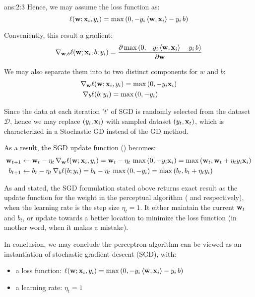 \documentclass{tron}
\begin{document}
\begin{answer}[SGD]{ans:2:3}
	Hence, we may assume the loss function as:
    \begin{equation}
    	\ell(\mathbf{w};\mathbf{x}_i,y_i) = \max{(0, - y_i\,\langle \mathbf{w}, \mathbf{x}_i \rangle - y_i \, b)}
    \end{equation}

    Conveniently, this result a gradient:
    \begin{equation}
    	\nabla_{\mathbf{w},b} \ell(\mathbf{w};\mathbf{x}_i,b;y_i) = \frac{\partial \max{(0, - y_i\,\langle \mathbf{w}, \mathbf{x}_i \rangle - y_i \, b)}}{\partial \mathbf{w}}
    \end{equation}
    
    We may also separate them into to two distinct components for $w$ and $b$:
    \begin{align}
    	\nabla_{\mathbf{w}} & \ell(\mathbf{w};\mathbf{x}_i,y_i) = \max{(0, -y_i \mathbf{x}_i)}\\
    	\nabla_{b}   & \ell(b;y_i) = \max{(0, -y_i)}
    \end{align}

	Since the data at each iteration '$t$' of SGD is randomly selected from the dataset $\mathcal{D}$, hence we may replace $(y_i,\mathbf{x}_i)$ with sampled dataset $(y_t,\mathbf{x}_t)$, which is characterized in a Stochastic GD instead of the GD method. 
	
	As a result, the SGD update function () becomes:
	\begin{align}
		\mathbf{w}_{t+1} &\leftarrow \mathbf{w}_t - \eta_t \,\nabla_{\mathbf{w}}\ell(\mathbf{w};\mathbf{x}_i,y_i) = \mathbf{w}_t - \eta_t \, \max{(0, -y_i \mathbf{x}_i)} = \max{(\mathbf{w}_t, \mathbf{w}_t + \eta_t y_i \mathbf{x}_i)} \label{eqn:q23:result}\\
		b_{t+1} &\leftarrow b_t - \eta_t \,\nabla_{b}\ell(b;y_i) = b_t - \eta_t \, \max{(0, -y_i)} = \max{(b_t,  b_t + \eta_t y_i)}  \label{eqn:q23:result2}
	\end{align}

	As  and \label{eqn:q23:result2} stated, the SGD formulation stated above returns exact result as the update function for the weight in the perceptual algorithm ( and  respectively), when the learning rate is the step size $\eta_t = 1$. It either maintain the current $\mathbf{w}_t$ and $b_t$, or update towards a better location to minimize the loss function (in another word, when it makes a mistake).

	In conclusion, we may conclude the perceptron algorithm can be viewed as an instantiation of stochastic gradient descent (SGD), with:
	\begin{itemize}
		\item a loss function:  $\ell(\mathbf{w};\mathbf{x}_i,y_i) = \max{(0, - y_i\,\langle \mathbf{w}, \mathbf{x}_i \rangle - y_i \, b)}$
		\item a learning rate: 	$\eta_t = 1$
	\end{itemize}
\end{answer}
\end{document}
